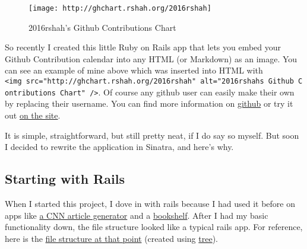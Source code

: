 \begin{figure}[htbp]
\centering
\texttt{[image: http://ghchart.rshah.org/2016rshah]}
\caption{2016rshah's Github Contributions Chart}
\end{figure}

So recently I created this little Ruby on Rails app that lets you embed
your Github Contribution calendar into any HTML (or Markdown) as an
image. You can see an example of mine above which was inserted into HTML
with
\texttt{\textless{}img\ src="http://ghchart.rshah.org/2016rshah"\ alt="2016rshah\textquotesingle{}s\ Github\ Contributions\ Chart"\ /\textgreater{}}.
Of course any github user can easily make their own by replacing their
username. You can find more information on
\href{https://github.com/2016rshah/githubchart-api}{github} or try it
out \href{http://ghchart.rshah.org/}{on the site}.

It is simple, straightforward, but still pretty neat, if I do say so
myself. But soon I decided to rewrite the application in Sinatra, and
here's why.

\subsection{Starting with Rails}\label{starting-with-rails}

When I started this project, I dove in with rails because I had used it
before on apps like \href{}{a CNN article generator} and a
\href{}{bookshelf}. After I had my basic functionality down, the file
structure looked like a typical rails app. For reference, here is the
\href{https://github.com/2016rshah/githubchart-api/tree/bb813c46188d24a7eb620b69c2a4f07baacc505f}{file
structure at that point} (created using
\href{http://mama.indstate.edu/users/ice/tree/}{tree}).


